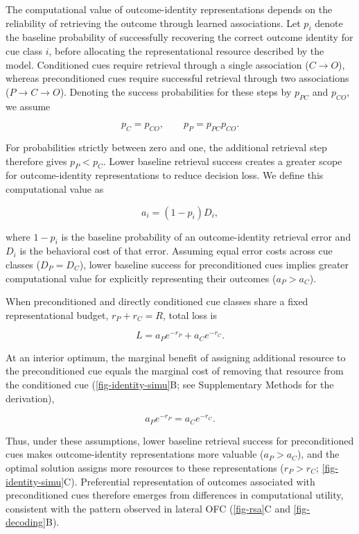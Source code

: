 \documentclass[12pt,letterpaper]{article}
\begin{document}
The computational value of outcome-identity representations depends on the reliability of retrieving the outcome through learned associations. Let $p_i$ denote the baseline probability of successfully recovering the correct outcome identity for cue class $i$, before allocating the representational resource described by the model. Conditioned cues require retrieval through a single association ($C \rightarrow O$), whereas preconditioned cues require successful retrieval through two associations ($P \rightarrow C \rightarrow O$). Denoting the success probabilities for these steps by $p_{PC}$ and $p_{CO}$, we assume

\begin{equation}
p_C = p_{CO}, \qquad p_P = p_{PC}p_{CO}.
\end{equation}

For probabilities strictly between zero and one, the additional retrieval step therefore gives $p_P < p_C$. Lower baseline retrieval success creates a greater scope for outcome-identity representations to reduce decision loss. We define this computational value as

\begin{equation}
a_i = (1-p_i)D_i,
\end{equation}

where $1-p_i$ is the baseline probability of an outcome-identity retrieval error and $D_i$ is the behavioral cost of that error. Assuming equal error costs across cue classes ($D_P = D_C$), lower baseline success for preconditioned cues implies greater computational value for explicitly representing their outcomes ($a_P > a_C$).

When preconditioned and directly conditioned cue classes share a fixed representational budget,
$r_P + r_C = R$, total loss is

\begin{equation}
L = a_P e^{-r_P} + a_C e^{-r_C}.
\end{equation}

At an interior optimum, the marginal benefit of assigning additional resource to the preconditioned cue equals the marginal cost of removing that resource from the conditioned cue (\autoref{fig-identity-simu}B; see Supplementary Methods for the derivation),

\begin{equation}
a_P e^{-r_P} = a_C e^{-r_C}.
\end{equation}

Thus, under these assumptions, lower baseline retrieval success for preconditioned cues makes outcome-identity representations more valuable ($a_P > a_C$), and the optimal solution assigns more resources to these representations ($r_P > r_C$; \autoref{fig-identity-simu}C). Preferential representation of outcomes associated with preconditioned cues therefore emerges from differences in computational utility, consistent with the pattern observed in lateral OFC (\autoref{fig-rsa}C and \autoref{fig-decoding}B).
\end{document}
